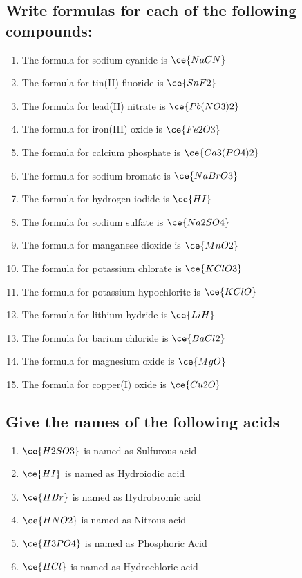\documentclass{scrartcl}
\begin{document}
\subsection{Write formulas for each of the following compounds:}
\label{sec:org1ea0b5f}
\begin{enumerate}
\item The formula for sodium cyanide is \(\ce{NaCN}\)
\item The formula for tin(II) fluoride is \(\ce{SnF2}\)
\item The formula for lead(II) nitrate is \(\ce{Pb(NO3)2}\)
\item The formula for iron(III) oxide is \(\ce{Fe2O3}\)
\item The formula for calcium phosphate is \(\ce{Ca3(PO4)2}\)
\item The formula for sodium bromate is \(\ce{NaBrO3}\)
\item The formula for hydrogen iodide is \(\ce{HI}\)
\item The formula for sodium sulfate is \(\ce{Na2SO4}\)
\item The formula for manganese dioxide is \(\ce{MnO2}\)
\item The formula for potassium chlorate is \(\ce{KClO3}\)
\item The formula for potassium hypochlorite is \(\ce{KClO}\)
\item The formula for lithium hydride is \(\ce{LiH}\)
\item The formula for barium chloride is \(\ce{BaCl2}\)
\item The formula for magnesium oxide is \(\ce{MgO}\)
\item The formula for copper(I) oxide is \(\ce{Cu2O}\)
\end{enumerate}

\subsection{Give the names of the following acids}
\label{sec:orga40f88c}
\begin{enumerate}
\item \(\ce{H2SO3}\) is named as Sulfurous acid
\item \(\ce{HI}\) is named as Hydroiodic acid
\item \(\ce{HBr}\) is named as Hydrobromic acid
\item \(\ce{HNO2}\) is named as Nitrous acid
\item \(\ce{H3PO4}\) is named as Phosphoric Acid
\item \(\ce{HCl}\) is named as Hydrochloric acid
\end{enumerate}
\end{document}

